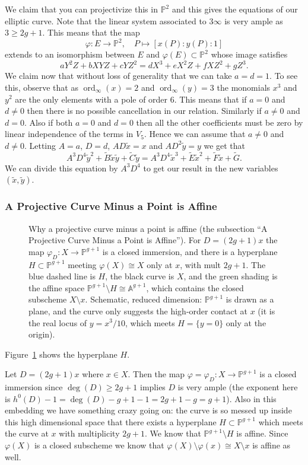 \documentclass[12pt]{article}
\numberwithin{equation}{section}
\theoremstyle{definition}
\theoremstyle{remark}
\newcommand{\PP}{\mathbb{P}}
\renewcommand{\AA}{\mathbb{A}}
\newcommand{\ord}{\operatorname{ord}}
\newcommand{\xtilde}{\widetilde{x}}
\newcommand{\ytilde}{\widetilde{y}}
\newcommand{\Btilde}{\widetilde{B}}
\newcommand{\Ctilde}{\widetilde{C}}
\newcommand{\Etilde}{\widetilde{E}}
\newcommand{\Ftilde}{\widetilde{F}}
\newcommand{\Gtilde}{\widetilde{G}}
\begin{document}
We claim that you can projectivize this in $\PP^2$ and this gives the equations of our elliptic curve.
Note that the linear system associated to $3\infty$ is very ample as $3\geq 2g+1$.
This means that the map 
$$ \varphi: E \to \PP^2, \quad P\mapsto [x(P):y(P):1] $$
extends to an isomorphism between $E$ and $\varphi(E) \subset \PP^2$ whose image satisfies
 $$ aY^2Z+bXYZ+cYZ^2=dX^3+eX^2Z+fXZ^2+gZ^3.$$
We claim now that without loss of generality that we can take $a=d=1$.
To see this, observe that as $\ord_{\infty}(x)=2$ and $\ord_{\infty}(y)=3$ the monomials $x^3$ and $y^2$ are the only elements with a pole of order $6$. 
This means that if $a=0$ and $d\neq 0$ then there is no possible cancellation in our relation. 
Similarly if $a\neq0$ and $d=0$. 
Also if both $a=0$ and $d=0$ then all the other coefficients must be zero by linear independence of the terms in $V_5$.
Hence we can assume that $a\neq 0$ and $d\neq 0$.
Letting $A=a$, $D=d$, $AD\xtilde =x$ and $AD^2 \ytilde = y$ we get that 
  $$A^3D^4 \ytilde^2+\Btilde \xtilde \ytilde +\Ctilde \ytilde= A^3D^4 \xtilde^3+\Etilde \xtilde^2 + \Ftilde \xtilde + \Gtilde.$$
We can divide this equation by $A^3D^4$ to get our result in the new variables $(\xtilde,\ytilde)$.
\subsubsection{A Projective Curve Minus a Point is Affine}
\begin{figure}[H]
\centering

\caption{Why a projective curve minus a point is affine (the subsection ``A Projective Curve Minus a Point is Affine''). For $D=(2g+1)x$ the map $\varphi_D\colon X\to\PP^{g+1}$ is a closed immersion, and there is a hyperplane $H\subset\PP^{g+1}$ meeting $\varphi(X)\cong X$ only at $x$, with mult $2g+1$. The blue dashed line is $H$, the black curve is $X$, and the green shading is the affine space $\PP^{g+1}\setminus H\cong\AA^{g+1}$, which contains the closed subscheme $X\setminus x$. Schematic, reduced dimension: $\PP^{g+1}$ is drawn as a plane, and the curve only suggests the high-order contact at $x$ (it is the real locus of $y=x^3/10$, which meets $H=\{y=0\}$ only at the origin).}\label{fig:curve-minus-point-affine}
\end{figure}
Figure~\ref{fig:curve-minus-point-affine} shows the hyperplane $H$.

Let $D=(2g+1)x$ where $x \in X$.
Then the map $\varphi=\varphi_D:X \to \PP^{g+1}$ is a closed immersion since $\deg(D)\geq 2g+1$ implies $D$ is very ample (the exponent here is $h^0(D)-1=\deg(D)-g+1-1=2g+1-g=g+1$).
Also in this embedding we have something crazy going on: the curve is so messed up inside this high dimensional space that there exists a hyperplane $H\subset \PP^{g+1}$ which meets the curve at $x$ with multiplicity $2g+1$.
We know that $\PP^{g+1}\setminus H$ is affine. 
Since $\varphi(X)$ is a closed subscheme we know that $\varphi(X)\setminus \varphi(x) \cong X\setminus x$ is affine as well.
\end{document}
